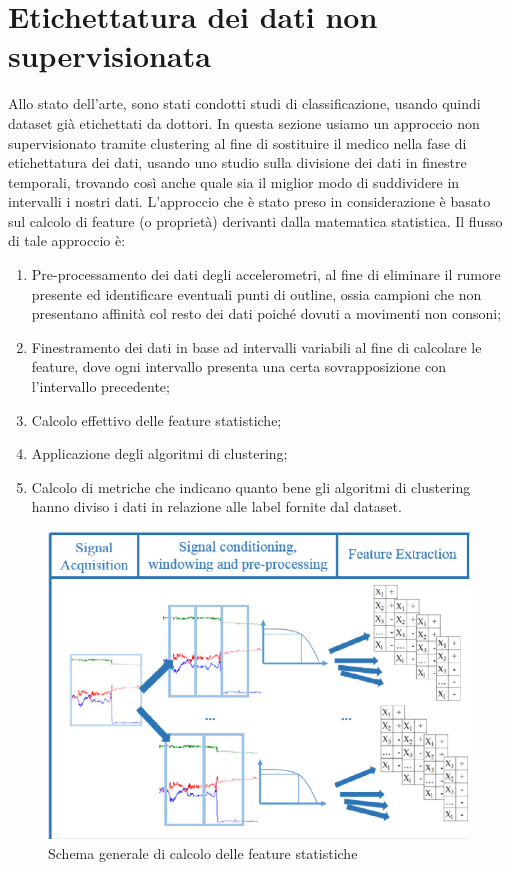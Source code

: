 \section{Etichettatura dei dati non supervisionata}
Allo stato dell'arte, sono stati condotti studi di classificazione, usando quindi dataset già etichettati da dottori. In questa sezione usiamo un approccio non supervisionato tramite clustering al fine di sostituire il medico nella fase di etichettatura dei dati, usando uno studio sulla divisione dei dati in finestre temporali, trovando così anche quale sia il miglior modo di suddividere in intervalli i nostri dati. L'approccio che è stato preso in considerazione è basato sul calcolo di feature (o proprietà) derivanti dalla matematica statistica. Il flusso di tale approccio è:
\begin{enumerate}
	\item Pre-processamento dei dati degli accelerometri, al fine di eliminare il rumore presente ed identificare eventuali punti di outline, ossia campioni che non presentano affinità col resto dei dati poiché dovuti a movimenti non consoni;
	\item Finestramento dei dati in base ad intervalli variabili al fine di calcolare le feature, dove ogni intervallo presenta una certa sovrapposizione con l'intervallo precedente;
	\item Calcolo effettivo delle feature statistiche;
	\item Applicazione degli algoritmi di clustering;
	\item Calcolo di metriche che indicano quanto bene gli algoritmi di clustering hanno diviso i dati in relazione alle label fornite dal dataset.
\end{enumerate}
\begin{figure}[h!]
	\centering
	\includegraphics[scale=0.6]{images/flusso_feature.png}
	\caption{Schema generale di calcolo delle feature statistiche}
	\label{Flusso Feature}
\end{figure}
